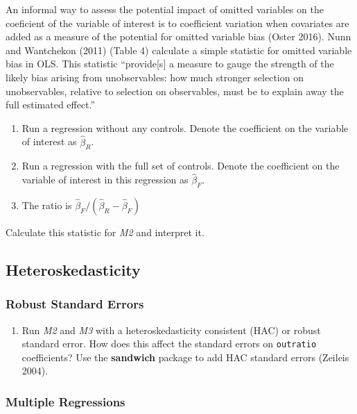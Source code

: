 \documentclass[]{article}
\providecommand{\tightlist}{%
  \setlength{\itemsep}{0pt}\setlength{\parskip}{0pt}}
\begin{document}
An informal way to assess the potential impact of omitted variables on
the coeficient of the variable of interest is to coefficient variation
when covariates are added as a measure of the potential for omitted
variable bias (Oster 2016). Nunn and Wantchekon (2011) (Table 4)
calculate a simple statistic for omitted variable bias in OLS. This
statistic ``provide{[}s{]} a measure to gauge the strength of the likely
bias arising from unobservables: how much stronger selection on
unobservables, relative to selection on observables, must be to explain
away the full estimated effect.''

\begin{enumerate}
\def\labelenumi{\arabic{enumi}.}
\tightlist
\item
  Run a regression without any controls. Denote the coefficient on the
  variable of interest as \(\hat\beta_R\).
\item
  Run a regression with the full set of controls. Denote the coefficient
  on the variable of interest in this regression as \(\hat\beta_F\).
\item
  The ratio is \(\hat\beta_F / (\hat\beta_R - \hat\beta_F)\)
\end{enumerate}

Calculate this statistic for \emph{M2} and interpret it.

\subsection{Heteroskedasticity}\label{heteroskedasticity}

\subsubsection{Robust Standard Errors}\label{robust-standard-errors}

\begin{enumerate}
\def\labelenumi{\arabic{enumi}.}
\tightlist
\item
  Run \emph{M2} and \emph{M3} with a heteroskedasticity consistent (HAC)
  or robust standard error. How does this affect the standard errors on
  \texttt{outratio} coefficients? Use the \textbf{sandwich} package to
  add HAC standard errors (Zeileis 2004).
\end{enumerate}

\subsubsection{Multiple Regressions}\label{multiple-regressions}
\end{document}
